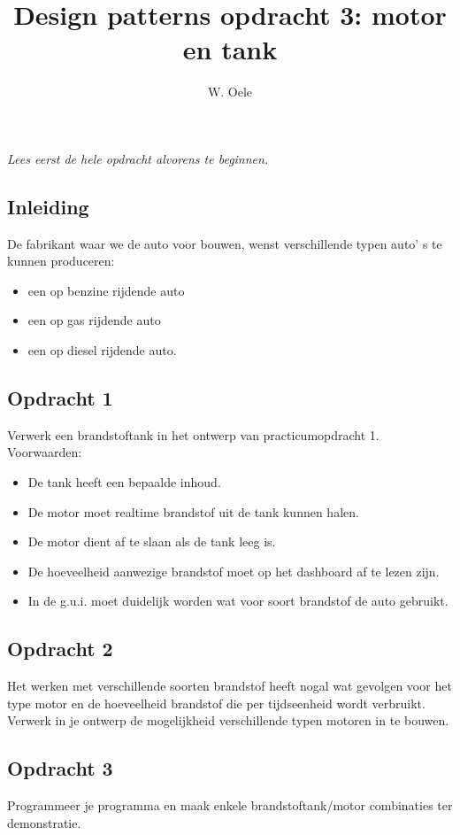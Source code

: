 \documentclass[fleqn,11pt]{article}
\title{Design patterns opdracht 3: motor en tank}
\author{W. Oele}
\begin{document}
\sffamily
\maketitle
\newpage
\emph{Lees eerst de hele opdracht alvorens te beginnen.}

\subsection*{Inleiding}
De fabrikant waar we de auto voor bouwen, wenst verschillende typen auto' s te kunnen produceren:
\begin{itemize}
\item een op benzine rijdende auto
\item een op gas rijdende auto
\item een op diesel rijdende auto.
\end{itemize}

\subsection*{Opdracht 1}
Verwerk een brandstoftank in het ontwerp van practicumopdracht 1. Voorwaarden:
\begin{itemize}
\item De tank heeft een bepaalde inhoud.
\item De motor moet realtime brandstof uit de tank kunnen halen.
\item De motor dient af te slaan als de tank leeg is.
\item De hoeveelheid aanwezige brandstof moet op het dashboard af te lezen zijn.
\item In de g.u.i. moet duidelijk worden wat voor soort brandstof de auto gebruikt.
\end{itemize}

\subsection*{Opdracht 2}
Het werken met verschillende soorten brandstof heeft nogal wat gevolgen voor het type motor en de hoeveelheid brandstof die per tijdseenheid wordt verbruikt. Verwerk in je ontwerp de mogelijkheid verschillende typen motoren in te bouwen. 

\subsection*{Opdracht 3}
Programmeer je programma en maak enkele brandstoftank/motor combinaties ter demonstratie. 

\begin{center}
\end{center}
\end{document}

